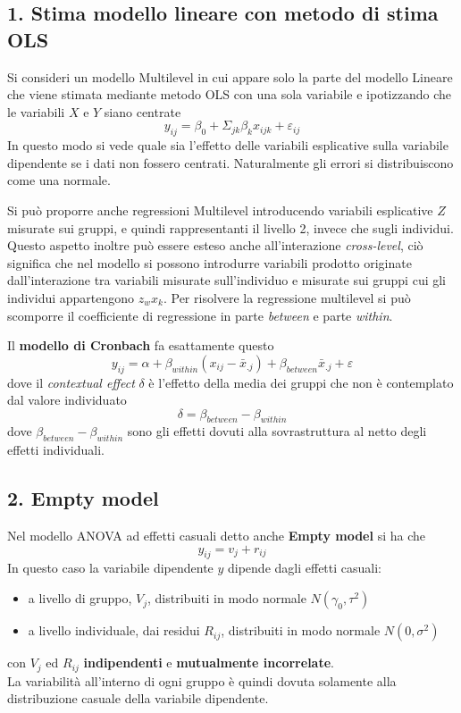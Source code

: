\documentclass[a4page, 11pt]{article} %
\begin{document}
\subsection*{1. Stima modello lineare con metodo di stima OLS}
Si consideri un modello Multilevel in cui appare solo la parte del modello Lineare che viene stimata mediante metodo OLS con una sola variabile e ipotizzando che le variabili $X$ e $Y$ siano centrate
\begin{equation*}
y_{ij}= \beta_0+\Sigma_{jk} \beta_k x_{ijk}+\varepsilon_{ij}
\end{equation*}
In questo modo si vede quale sia l’effetto delle variabili esplicative sulla variabile dipendente se i dati non fossero centrati. Naturalmente gli errori si distribuiscono come una normale.

Si può proporre anche regressioni Multilevel introducendo variabili esplicative $Z$ misurate sui gruppi, e quindi rappresentanti il livello 2, invece che sugli individui. Questo aspetto inoltre può essere esteso anche all'interazione \textit{cross-level}, ciò significa che nel modello si possono introdurre variabili prodotto originate dall'interazione tra variabili misurate sull'individuo e misurate sui gruppi cui gli individui appartengono $z_w x_k$. Per risolvere la regressione multilevel si può scomporre il coefficiente di regressione in parte \textit{between} e parte \textit{within}. 

Il \textbf{modello di Cronbach} fa esattamente questo
\begin{equation*}
y_{ij} = \alpha +\beta_{within}(x_{ij}-\bar{x}_{.j}) +\beta_{between}\bar{x}_{.j}+\varepsilon
\end{equation*}
dove il \textit{contextual effect} $\delta$ è l'effetto della media dei gruppi che non è contemplato dal valore individuato
\begin{equation*}
\delta = \beta_{between}-\beta_{within}
\end{equation*}
dove $\beta_{between}-\beta_{within}$ sono gli effetti dovuti alla sovrastruttura al netto degli effetti individuali. 
\subsection*{2. Empty model}
Nel modello ANOVA ad effetti casuali detto anche \textbf{Empty model} si ha che
\begin{equation*}
y_{ij}=v_j+r_{ij}
\end{equation*}
In questo caso la variabile dipendente $y$ dipende dagli effetti casuali:
\begin{itemize}
\item a livello di gruppo, $V_j$, distribuiti in modo normale $N(\gamma_0, \tau^2)$
\item a livello individuale, dai residui $R_{ij}$, distribuiti in modo normale $N(0, \sigma^2)$ 
\end{itemize}
con $V_j$ ed $R_{ij}$ \textbf{indipendenti} e \textbf{mutualmente incorrelate}. \\
La variabilità all’interno di ogni gruppo è quindi dovuta solamente alla distribuzione casuale della variabile dipendente.
\end{document}
